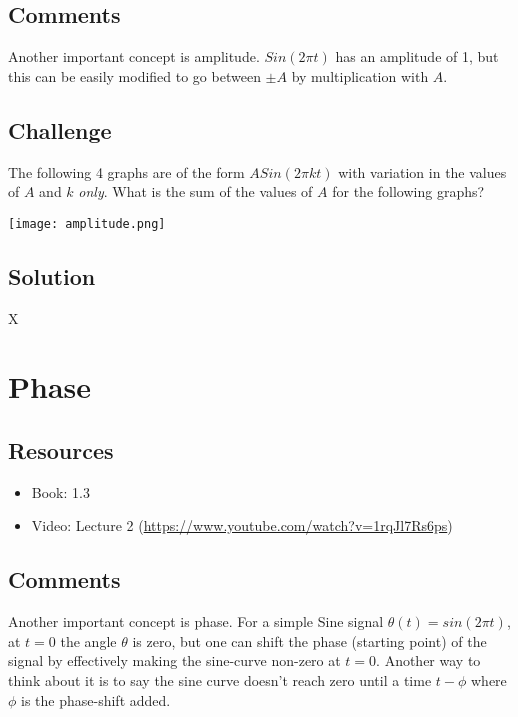 \subsection*{Comments}
Another important concept is amplitude. $Sin(2 \pi t)$ has an amplitude of 1, but this can be easily modified to go between $\pm A$ by multiplication with $A$.

\subsection*{Challenge}

The following 4 graphs are of the form $A Sin(2 \pi k t)$ with variation in the values of $A$ and $k$ \emph{only}. What is the sum of the values of $A$ for the following graphs? 

\texttt{[image: amplitude.png]}

\subsection*{Solution}
X





\newpage

\section{Phase}

\subsection*{Resources}
\begin{itemize}
    \item Book: 1.3
    \item Video: Lecture 2 (\url{https://www.youtube.com/watch?v=1rqJl7Rs6ps})
\end{itemize}

\subsection*{Comments}
Another important concept is phase. For a simple Sine signal $\theta(t) = sin(2 \pi t)$, at $t=0$ the angle $\theta$ is zero, but one can shift the phase (starting point) of the signal by effectively making the sine-curve non-zero at $t=0$. Another way to think about it is to say the sine curve doesn't reach zero until a time $t-\phi$ where $\phi$ is the phase-shift added.

